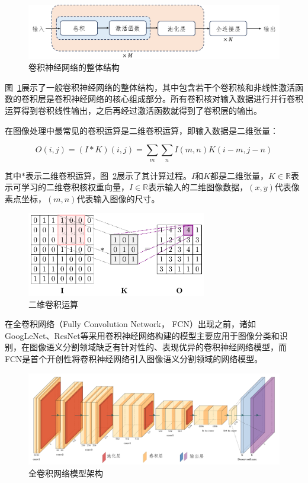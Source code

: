 \begin{figure}[htbp]
    \centering
    \includegraphics[width=\textwidth]{fig/cnn_frame.png}
    \caption{卷积神经网络的整体结构}
    \label{fig:cnn}
\end{figure}

图~\ref{fig:cnn}展示了一般卷积神经网络的整体结构，其中包含若干个卷积核和非线性激活函数的卷积层是卷积神经网络的核心组成部分。所有卷积核对输入数据进行并行卷积运算得到卷积线性输出，之后再经过激活函数就得到了卷积层的输出\cite{Goodfellow-et-al-2016}。

在图像处理中最常见的卷积运算是二维卷积运算，即输入数据是二维张量：

\begin{equation}
    O(i, j)=(I * K)(i, j)=\sum_{m} \sum_{n} I(m, n) K(i-m, j-n)
\end{equation}

其中$*$表示二维卷积运算，图~\ref{fig:2dcnn}展示了其计算过程。$I$和$K$都是二维张量，$ K \in \mathbb{R}$表示可学习的二维卷积核权重向量，$I \in \mathbb{R}$表示输入的二维图像数据，$(x, y)$代表像素点坐标，$(m, n)$代表输入图像的尺寸。

\begin{figure}[!htbp]
    \centering
    \includegraphics[width=0.7\textwidth]{fig/2dcnn-1.png}
    \caption{二维卷积运算}
    \label{fig:2dcnn}
\end{figure}

在全卷积网络（Fully Convolution Network， FCN）出现之前，诸如GoogLeNet、ResNet等\cite{szegedy2014,he2015}采用卷积神经网络构建的模型主要应用于图像分类和识别，在图像语义分割领域缺乏有针对性的、表现优异的卷积神经网络模型，而FCN是首个开创性将卷积神经网络引入图像语义分割领域的网络模型\cite{shelhamer2016}。

\begin{figure}[!htbp]
    \centering
    \includegraphics[width=\textwidth]{fig/fcn_frame.png}
    \caption{全卷积网络模型架构}
    \label{fig:fcn_frame}
\end{figure}

